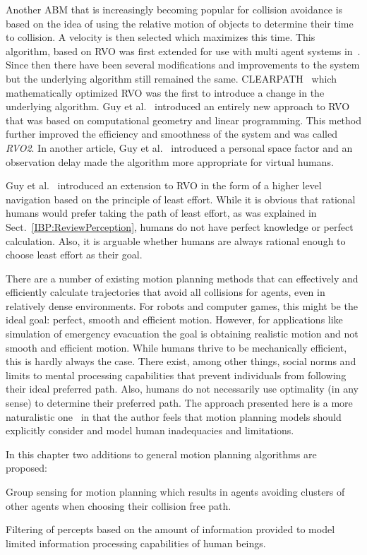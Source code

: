 Another ABM that is increasingly becoming popular for collision avoidance is based on the idea of using the relative motion of objects to determine their time to collision. A velocity is then selected which maximizes this time. This algorithm, based on RVO was first extended for use with multi agent systems in~\cite{vandenBerg:2008cq}. Since then there have been several modifications and improvements to the system but the underlying algorithm still remained the same. CLEARPATH~\cite{Guy:2009gu} which mathematically optimized RVO was the first to introduce a change in the underlying algorithm. Guy et al.~\cite{Guy:2010ko} introduced an entirely new approach to RVO that was based on computational geometry and linear programming. This method further improved the efficiency and smoothness of the system and was called \emph{RVO2}. In another article, Guy et al.~\cite{Guy:2010uv} introduced a personal space factor and an observation delay made the algorithm more appropriate for virtual humans.

Guy et al.~\cite{Guy:2010uv} introduced an extension to RVO in the form of a higher level navigation based on the principle of least effort. While it is obvious that rational humans would prefer taking the path of least effort, as was explained in Sect.~\ref{IBP:ReviewPerception}, humans do not have perfect knowledge or perfect calculation. Also, it is arguable whether humans are always rational enough to choose least effort as their goal.

There are a number of existing motion planning methods that can effectively and efficiently calculate trajectories that avoid all collisions for agents, even in relatively dense environments. For robots and computer games, this might be the ideal goal: perfect, smooth and efficient motion. However, for applications like simulation of emergency evacuation the goal is obtaining realistic motion and not smooth and efficient motion. While humans thrive to be mechanically efficient, this is hardly always the case. There exist, among other things, social norms and limits to mental processing capabilities that prevent individuals from following their ideal preferred path. Also, humans do not necessarily use optimality (in any sense) to determine their preferred path. The approach presented here is a more naturalistic one~\cite{Klein:2009} in that the author feels that motion planning models should explicitly consider and model human inadequacies and limitations. 

In this chapter two additions to general motion planning algorithms are proposed: 
\begin{inparaenum}
\item Group sensing for motion planning which results in agents avoiding clusters of other agents when choosing their collision free path.
\item Filtering of percepts based on the amount of information provided to model limited information processing capabilities of human beings.
\end{inparaenum}

